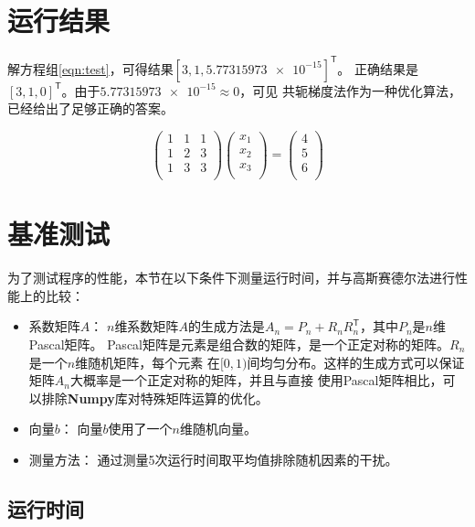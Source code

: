 \documentclass[a4paper,twoside]{article}
\begin{document}
\begin{spacing}{1.2}
\section{运行结果}

解方程组\eqref{eqn:test}，可得结果$[3,1,\num{5.77315973e-15}]^\mathsf{T}$。
正确结果是$[3,1,0]^\mathsf{T}$。由于$\num{5.77315973e-15}\approx 0$，可见
共轭梯度法作为一种优化算法，已经给出了足够正确的答案。


\begin{equation}
	\label{eqn:test}
	\begin{pmatrix}
		1 & 1 & 1 \\
		1 & 2 & 3 \\
		1 & 3 & 3 \\
	\end{pmatrix}
	\begin{pmatrix}
		x_1  \\
		x_2  \\
		x_3  \\
	\end{pmatrix}
	=
	\begin{pmatrix}
		4  \\
		5  \\
		6  \\
	\end{pmatrix}
\end{equation}


\section{基准测试}

为了测试程序的性能，本节在以下条件下测量运行时间，并与高斯赛德尔法进行性能上的比较：

\begin{itemize}
	\item 系数矩阵$A$：
	$n$维系数矩阵$A$的生成方法是$A_n=P_n+R_n R_n^{\mathsf{T}}$，其中$P_n$是$n$维Pascal矩阵。
	Pascal矩阵是元素是组合数的矩阵，是一个正定对称的矩阵。$R_n$是一个$n$维随机矩阵，每个元素
	在$[0,1)$间均匀分布。这样的生成方式可以保证矩阵$A_n$大概率是一个正定对称的矩阵，并且与直接
	使用Pascal矩阵相比，可以排除\textbf{Numpy}库对特殊矩阵运算的优化。
 	\item 向量$b$：
	向量$b$使用了一个$n$维随机向量。
	\item 测量方法：
	通过测量5次运行时间取平均值排除随机因素的干扰。
\end{itemize}

\subsection{运行时间}


\end{spacing}
\end{document}

